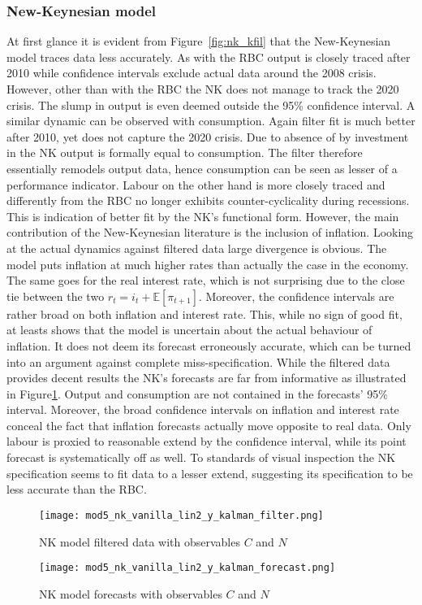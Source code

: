 \documentclass[12pt,a4paper,english]{article} %
\newcommand{\E}{\mathbb{E}} %
\begin{document}
	\subsubsection{New-Keynesian model}
	At first glance it is evident from Figure~\ref{fig:nk_kfil} that the New-Keynesian model traces data less accurately. As with the RBC output is closely traced after 2010 while confidence intervals exclude actual data around the 2008 crisis. However, other than with the RBC the NK does not manage to track the 2020 crisis. The slump in output is even deemed outside the 95\% confidence interval. A similar dynamic can be observed with consumption. Again filter fit is much better after 2010, yet does not capture the 2020 crisis. Due to absence of by investment in the NK output is formally equal to consumption. The filter therefore essentially remodels output data, hence consumption can be seen as lesser of a performance indicator. Labour on the other hand is more closely traced and differently from the RBC no longer exhibits counter-cyclicality during recessions. This is indication of better fit by the NK's functional form. However, the main contribution of the New-Keynesian literature is the inclusion of inflation. Looking at the actual dynamics against filtered data large divergence is obvious. The model puts inflation at much higher rates than actually the case in the economy. The same goes for the real interest rate, which is not surprising due to the close tie between the two $r_t = i_t + \E[\pi_{t+1}]$. Moreover, the confidence intervals are rather broad on both inflation and interest rate. This, while no sign of good fit, at leasts shows that the model is uncertain about the actual behaviour of inflation. It does not deem its forecast erroneously accurate, which can be turned into an argument against complete miss-specification.		
	While the filtered data provides decent results the NK's forecasts are far from informative as illustrated in Figure\ref{fig:nk_kfor}. Output and consumption are not contained in the forecasts' 95\% interval. Moreover, the broad confidence intervals on inflation and interest rate conceal the fact that inflation forecasts actually move opposite to real data. Only labour is proxied to reasonable extend by the confidence interval, while its point forecast is systematically off as well. To standards of visual inspection the NK specification seems to fit data to a lesser extend, suggesting its specification to be less accurate than the RBC. 
	\begin{figure}[H]
		\begin{center}
			\texttt{[image: mod5\_nk\_vanilla\_lin2\_y\_kalman\_filter.png]}
			\caption{NK model filtered data with observables $C$ and $N$}\label{fig:nk_kfil}
			\texttt{[image: mod5\_nk\_vanilla\_lin2\_y\_kalman\_forecast.png]}
			\caption{NK model forecasts with observables $C$ and $N$}\label{fig:nk_kfor}
		\end{center}
	\end{figure}
		
\end{document}
